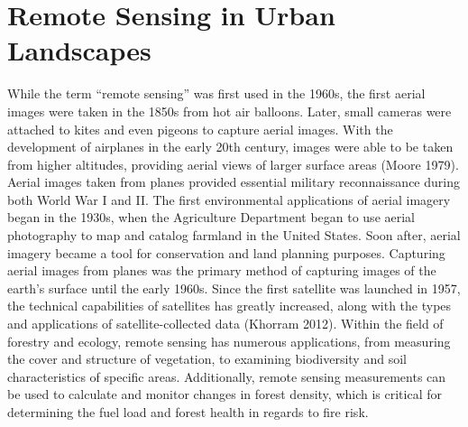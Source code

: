 \documentclass[12pt,twoside]{reedthesis}
\begin{document}
\hypertarget{remote-sensing-in-urban-landscapes}{%
\section{Remote Sensing in Urban Landscapes}\label{remote-sensing-in-urban-landscapes}}

While the term ``remote sensing'' was first used in the 1960s, the first
aerial images were taken in the 1850s from hot air balloons. Later,
small cameras were attached to kites and even pigeons to capture aerial
images. With the development of airplanes in the early 20th century,
images were able to be taken from higher altitudes, providing aerial
views of larger surface areas (Moore 1979). Aerial images taken from
planes provided essential military reconnaissance during both World War
I and II. The first environmental applications of aerial imagery began
in the 1930s, when the Agriculture Department began to use aerial
photography to map and catalog farmland in the United States. Soon
after, aerial imagery became a tool for conservation and land planning
purposes. Capturing aerial images from planes was the primary method of
capturing images of the earth's surface until the early 1960s. Since the
first satellite was launched in 1957, the technical capabilities of
satellites has greatly increased, along with the types and applications
of satellite-collected data (Khorram 2012). Within the field of forestry
and ecology, remote sensing has numerous applications, from measuring
the cover and structure of vegetation, to examining biodiversity and
soil characteristics of specific areas. Additionally, remote sensing
measurements can be used to calculate and monitor changes in forest
density, which is critical for determining the fuel load and forest
health in regards to fire risk.
\end{document}
